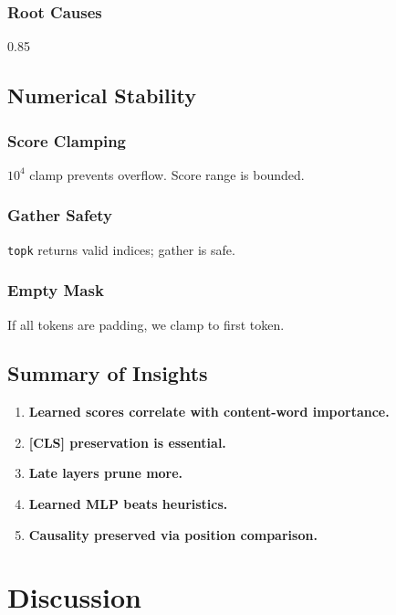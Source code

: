 \subsubsection{Root Causes}

0.85

\subsection{Numerical Stability}

\subsubsection{Score Clamping}

$10^4$ clamp prevents overflow. Score range is bounded.

\subsubsection{Gather Safety}

\texttt{topk} returns valid indices; gather is safe.

\subsubsection{Empty Mask}

If all tokens are padding, we clamp to first token.

\subsection{Summary of Insights}

\begin{enumerate}
\item \textbf{Learned scores correlate with content-word importance.}
\item \textbf{[CLS] preservation is essential.}
\item \textbf{Late layers prune more.}
\item \textbf{Learned MLP beats heuristics.}
\item \textbf{Causality preserved via position comparison.}

\end{enumerate}



\section{Discussion}


